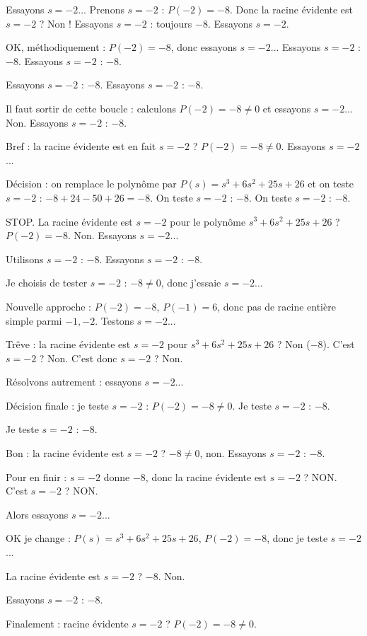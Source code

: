 \documentclass[11pt]{article}
\begin{document}
\begin{exoresolu}
\begin{enumerate}
Essayons $s = -2$... Prenons $s = -2$ : $P(-2) = -8$. Donc la racine évidente est $s = -2$ ? Non ! Essayons $s=-2$ : toujours $-8$. Essayons $s = -2$.

OK, méthodiquement : $P(-2) = -8$, donc essayons $s = -2$... Essayons $s = -2$ : $-8$. Essayons $s = -2$ : $-8$. 

Essayons $s = -2$ : $-8$. Essayons $s = -2$ : $-8$. 

Il faut sortir de cette boucle : calculons $P(-2) = -8 \neq 0$ et essayons $s = -2$... Non. Essayons $s = -2$ : $-8$. 

Bref : la racine évidente est en fait $s = -2$ ? $P(-2) = -8 \neq 0$. Essayons $s = -2$... 

Décision : on remplace le polynôme par $P(s) = s^3 + 6s^2 + 25s + 26$ et on teste $s = -2$ : $-8 + 24 - 50 + 26 = -8$. On teste $s = -2$ : $-8$. On teste $s = -2$ : $-8$. 

STOP. La racine évidente est $s = -2$ pour le polynôme $s^3 + 6s^2 + 25s + 26$ ? $P(-2) = -8$. Non. Essayons $s = -2$... 

Utilisons $s = -2$ : $-8$. Essayons $s = -2$ : $-8$. 

Je choisis de tester $s = -2$ : $-8 \neq 0$, donc j'essaie $s = -2$... 

Nouvelle approche : $P(-2) = -8$, $P(-1) = 6$, donc pas de racine entière simple parmi $-1, -2$. Testons $s = -2$... 

Trêve : la racine évidente est $s = -2$ pour $s^3+6s^2+25s+26$ ? Non ($-8$). C'est $s = -2$ ? Non. C'est donc $s = -2$ ? Non.

Résolvons autrement : essayons $s = -2$... 

Décision finale : je teste $s = -2$ : $P(-2) = -8 \neq 0$. Je teste $s = -2$ : $-8$. 

Je teste $s = -2$ : $-8$. 

Bon : la racine évidente est $s = -2$ ? $-8 \neq 0$, non. Essayons $s = -2$ : $-8$. 

Pour en finir : $s = -2$ donne $-8$, donc la racine évidente est $s = -2$ ? NON. C'est $s = -2$ ? NON. 

Alors essayons $s = -2$... 

OK je change : $P(s) = s^3 + 6s^2 + 25s + 26$, $P(-2) = -8$, donc je teste $s = -2$... 

La racine évidente est $s = -2$ ? $-8$. Non. 

Essayons $s = -2$ : $-8$. 

Finalement : racine évidente $s = -2$ ? $P(-2) = -8 \neq 0$. 


\end{enumerate}
\end{exoresolu}
\end{document}
